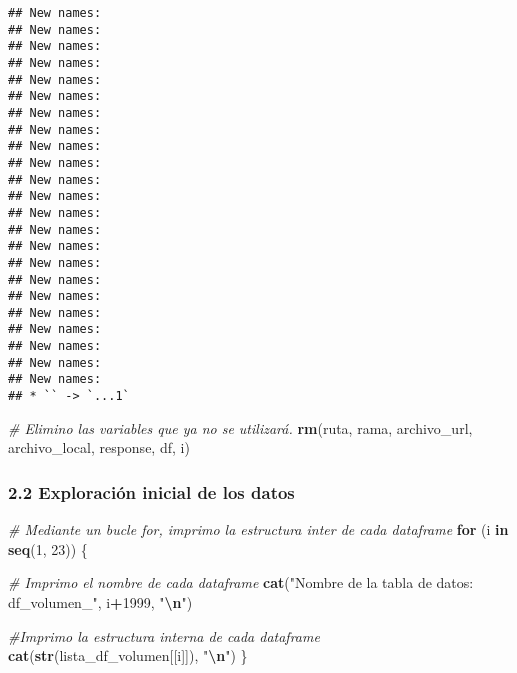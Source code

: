 \documentclass[
]{article}
\newenvironment{Shaded}{\begin{snugshade}}{\end{snugshade}}
\newcommand{\CommentTok}[1]{\textcolor[rgb]{0.56,0.35,0.01}{\textit{#1}}}
\newcommand{\ControlFlowTok}[1]{\textcolor[rgb]{0.13,0.29,0.53}{\textbf{#1}}}
\newcommand{\DecValTok}[1]{\textcolor[rgb]{0.00,0.00,0.81}{#1}}
\newcommand{\FunctionTok}[1]{\textcolor[rgb]{0.13,0.29,0.53}{\textbf{#1}}}
\newcommand{\NormalTok}[1]{#1}
\newcommand{\SpecialCharTok}[1]{\textcolor[rgb]{0.81,0.36,0.00}{\textbf{#1}}}
\newcommand{\StringTok}[1]{\textcolor[rgb]{0.31,0.60,0.02}{#1}}
\begin{document}
\begin{verbatim}
## New names:
## New names:
## New names:
## New names:
## New names:
## New names:
## New names:
## New names:
## New names:
## New names:
## New names:
## New names:
## New names:
## New names:
## New names:
## New names:
## New names:
## New names:
## New names:
## New names:
## New names:
## New names:
## New names:
## * `` -> `...1`
\end{verbatim}

\begin{Shaded}
\begin{Highlighting}[]
\CommentTok{\# Elimino las variables que ya no se utilizará.}
\FunctionTok{rm}\NormalTok{(ruta, rama, archivo\_url, archivo\_local, response, df, i)}
\end{Highlighting}
\end{Shaded}

\hypertarget{exploraciuxf3n-inicial-de-los-datos}{%
\subsubsection{2.2 Exploración inicial de los
datos}\label{exploraciuxf3n-inicial-de-los-datos}}

\begin{Shaded}
\begin{Highlighting}[]
\CommentTok{\# Mediante un bucle for, imprimo la estructura inter de cada dataframe}
\ControlFlowTok{for}\NormalTok{ (i }\ControlFlowTok{in} \FunctionTok{seq}\NormalTok{(}\DecValTok{1}\NormalTok{, }\DecValTok{23}\NormalTok{)) \{}
  
  \CommentTok{\# Imprimo el nombre de cada dataframe}
  \FunctionTok{cat}\NormalTok{(}\StringTok{"Nombre de la tabla de datos: df\_volumen\_"}\NormalTok{, i}\SpecialCharTok{+}\DecValTok{1999}\NormalTok{, }\StringTok{"}\SpecialCharTok{\textbackslash{}n}\StringTok{"}\NormalTok{)}
  
  \CommentTok{\#Imprimo la estructura interna de cada dataframe}
  \FunctionTok{cat}\NormalTok{(}\FunctionTok{str}\NormalTok{(lista\_df\_volumen[[i]]), }\StringTok{"}\SpecialCharTok{\textbackslash{}n}\StringTok{"}\NormalTok{)}
\NormalTok{\}}
\end{Highlighting}
\end{Shaded}
\end{document}
